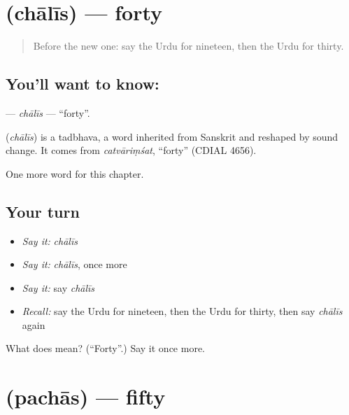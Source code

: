 \section[\texorpdfstring{\ur{چالیس} (chālīs)}{چالیس (chālīs)}]{ (chālīs) — forty}

\label{lesson:UR-C85-chalis}



\begin{quote}
Before the new one: say the Urdu for nineteen, then the Urdu for thirty.
\end{quote}

\subsection*{You'll want to know: }
\textbf{} — \emph{chālīs} — \textquotedblleft{}forty\textquotedblright{}.

\begin{cousinweb}
\textbf{} (\emph{chālīs}) is a tadbhava, a word inherited from Sanskrit and reshaped by sound change. It comes from \emph{catvāriṃśat}, \textquotedblleft{}forty\textquotedblright{} (CDIAL 4656).
\end{cousinweb}

\begin{grammarlens}[title={What you've built}]
One more word for this chapter.
\end{grammarlens}

\subsection*{Your turn}
\begin{itemize}
\raggedright
  \item \emph{Say it:} \emph{chālīs}
  \item \emph{Say it:} \emph{chālīs}, once more
  \item \emph{Say it:} say \emph{chālīs}
  \item \emph{Recall:} say the Urdu for nineteen, then the Urdu for thirty, then say \emph{chālīs} again
\end{itemize}

\begin{tcolorbox}[breakable,colback=teal!4,colframe=teal!35!black,title={Before you move on}]
What does  mean? (\textquotedblleft{}Forty\textquotedblright{}.) Say it once more.
\end{tcolorbox}
\section[\texorpdfstring{\ur{پچاس} (pachās)}{پچاس (pachās)}]{ (pachās) — fifty}

